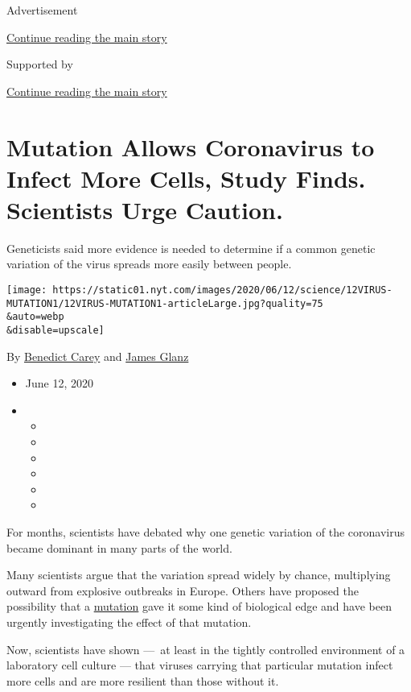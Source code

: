 Advertisement

\protect\hyperlink{after-top}{Continue reading the main story}

Supported by

\protect\hyperlink{after-sponsor}{Continue reading the main story}

\hypertarget{mutation-allows-coronavirus-to-infect-more-cells-study-finds-scientists-urge-caution}{%
\section{Mutation Allows Coronavirus to Infect More Cells, Study Finds.
Scientists Urge
Caution.}\label{mutation-allows-coronavirus-to-infect-more-cells-study-finds-scientists-urge-caution}}

Geneticists said more evidence is needed to determine if a common
genetic variation of the virus spreads more easily between people.

\texttt{[image: https://static01.nyt.com/images/2020/06/12/science/12VIRUS-MUTATION1/12VIRUS-MUTATION1-articleLarge.jpg?quality=75\\\&auto=webp\\\&disable=upscale]}

By \href{https://www.nytimes.com/by/benedict-carey}{Benedict Carey} and
\href{https://www.nytimes.com/by/james-glanz}{James Glanz}

\begin{itemize}
\item
  June 12, 2020
\item
  \begin{itemize}
  \item
  \item
  \item
  \item
  \item
  \item
  \end{itemize}
\end{itemize}

For months, scientists have debated why one genetic variation of the
coronavirus became dominant in many parts of the world.

Many scientists argue that the variation spread widely by chance,
multiplying outward from explosive outbreaks in Europe. Others have
proposed the possibility that a
\href{https://www.nytimes.com/2020/07/02/health/coronavirus-korber-mutation.html}{mutation}
gave it some kind of biological edge and have been urgently
investigating the effect of that mutation.

Now, scientists have shown ---~at least in the tightly controlled
environment of a laboratory cell culture --- that viruses carrying that
particular mutation infect more cells and are more resilient than those
without it.

